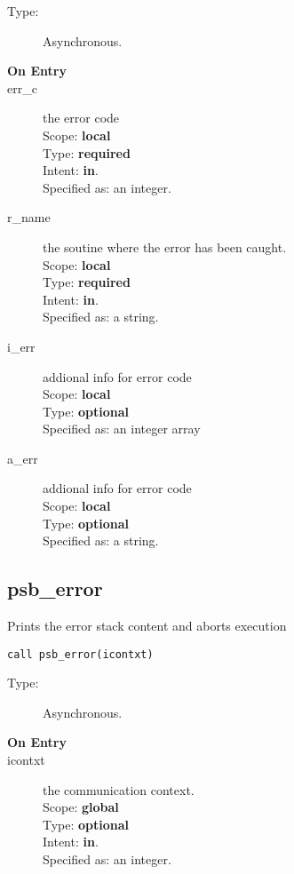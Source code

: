 \begin{description}
\item[Type:] Asynchronous.
\item[\bf On Entry]
\item[err\_c] the error code\\
Scope: {\bf local} \\
Type: {\bf required}\\
Intent: {\bf in}.\\
Specified as: an integer.
\item[r\_name] the soutine where the error has been caught.\\
Scope: {\bf local} \\
Type: {\bf required}\\
Intent: {\bf in}.\\
Specified as: a string.\\
\item[i\_err] addional info for error code\\
Scope: {\bf local} \\
Type: {\bf optional}\\
Specified as: an integer array\\
\item[a\_err] addional info for error code\\
Scope: {\bf local} \\
Type: {\bf optional}\\
Specified as: a string.\\
\end{description}

\clearpage\subsection{psb\_error}{Prints the error stack content and aborts
  execution}

\begin{lstlisting}
call psb_error(icontxt)
\end{lstlisting}

\begin{description}
\item[Type:] Asynchronous.
\item[\bf On Entry]
\item[icontxt] the communication context.\\
Scope: {\bf global} \\
Type: {\bf optional}\\
Intent: {\bf in}.\\
Specified as: an integer.
\end{description}



